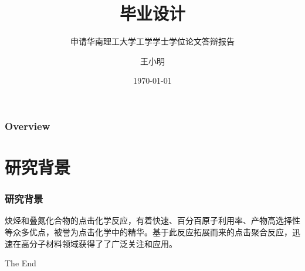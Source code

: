 \documentclass[presentation,aspectratio=169]{ctexbeamer}
\title{毕业设计} %
\subtitle{申请华南理工大学工学学士学位论文答辩报告}
\author{王小明} %
\institute %
{
计算机学院 \\ %
\medskip
wxm@mail.scut.edu.cn %
}
\date{\today} %
\begin{document}
\begin{frame}
\titlepage %
\end{frame}

\begin{frame}
\frametitle{Overview} %
\tableofcontents %
\end{frame}


\section{研究背景}
\begin{frame}
\frametitle{研究背景}
	炔烃和叠氮化合物的点击化学反应，有着快速、百分百原子利用率、产物高选择性等众多优点，被誉为点击化学中的精华。基于此反应拓展而来的点击聚合反应，迅速在高分子材料领域获得了了广泛关注和应用。
    
\end{frame}



\begin{frame}
\Huge{\centerline{The End}}
\end{frame}

\end{document}
